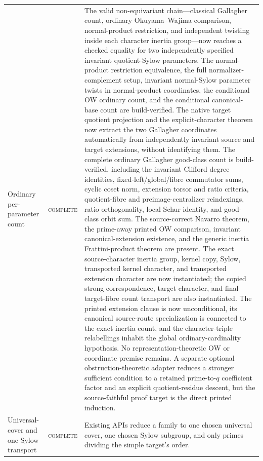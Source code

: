 \documentclass[11pt]{article}
\newcommand{\done}{\textcolor{donegreen}{\textsc{complete}}}
\begin{document}
\begin{longtable}{p{}p{}p{}}
Ordinary per-parameter count
& \done
& The valid non-equivariant chain---classical Gallagher count, ordinary
Okuyama--Wajima comparison, normal-product restriction, and independent
twisting inside each character inertia group---now reaches a checked
equality for two independently specified invariant quotient-Sylow
parameters.
The normal-product restriction equivalence, the full normalizer-complement
setup, invariant normal-Sylow parameter twists in normal-product
coordinates, the conditional OW ordinary count, and the conditional
canonical-base count are build-verified.  The native target quotient
projection and the explicit-character theorem now extract the two
Gallagher coordinates automatically from independently invariant source
and target extensions, without identifying them.
The complete ordinary Gallagher good-class count is build-verified,
including the invariant Clifford degree
identities, fixed-left/global/fibre commutator sums, cyclic coset norm,
extension torsor and ratio criteria, quotient-fibre and
preimage-centralizer reindexings, ratio orthogonality, local Schur identity,
and good-class orbit sum.  The source-correct Navarro theorem, the
prime-away printed OW comparison, invariant canonical-extension existence,
and the generic inertia Frattini-product theorem are present.  The exact
source-character inertia group, kernel copy, Sylow, transported kernel
character, and transported extension character are now instantiated; the
copied strong correspondence, target character, and final target-fibre
count transport are also instantiated.  The printed extension clause is
now unconditional, its canonical source-route specialization is connected
to the exact inertia count, and the character-triple relabellings inhabit
the global ordinary-cardinality hypothesis.  No representation-theoretic
OW or coordinate premise remains.
A separate optional
obstruction-theoretic adapter reduces a stronger sufficient condition to a
retained prime-to-\(q\) coefficient factor and an explicit quotient-residue
descent, but the source-faithful proof target is the direct printed
induction.\\

Universal-cover and one-Sylow transport
& \done
& Existing APIs reduce a family to one chosen universal cover, one chosen
Sylow subgroup, and only primes dividing the simple target's order.\\


\end{longtable}
\end{document}
